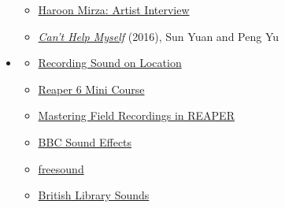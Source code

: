 \begin{itemize}[noitemsep,topsep=0pt,leftmargin=*]
\begin{itemize}
		      \item \href{https://www.youtube.com/watch?v=Y8Zpr1ESEO4}{Haroon Mirza: Artist Interview}
		      \item \href{https://www.youtube.com/watch?v=ZS4Bpr2BgnE}{\emph{Can’t Help Myself}} (2016), Sun Yuan and Peng Yu
	      \end{itemize}
	\item {}
	      \begin{resenv}
		      \begin{itemize}
			      \item \href{https://www.youtube.com/watch?v=TKBzjSSaKXU}{Recording Sound on Location}
			      \item \href{https://www.youtube.com/playlist?list=PLM0xHqxaiT6-plorG47t3balft4nVki39}{Reaper 6 Mini Course}
			      \item \href{https://www.youtube.com/watch?v=7BfWqRapF5E}{Mastering Field Recordings in REAPER}
			      \item \href{https://sound-effects.bbcrewind.co.uk/}{BBC Sound Effects}
			      \item \href{https://freesound.org/}{freesound}
			      \item \href{https://sounds.bl.uk/}{British Library Sounds}
		      \end{itemize}
	      \end{resenv}
\end{itemize}